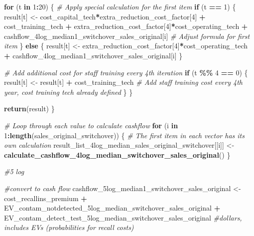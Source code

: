 \documentclass[
]{article}
\newenvironment{Shaded}{\begin{snugshade}}{\end{snugshade}}
\newcommand{\CommentTok}[1]{\textcolor[rgb]{0.56,0.35,0.01}{\textit{#1}}}
\newcommand{\ControlFlowTok}[1]{\textcolor[rgb]{0.13,0.29,0.53}{\textbf{#1}}}
\newcommand{\DecValTok}[1]{\textcolor[rgb]{0.00,0.00,0.81}{#1}}
\newcommand{\FunctionTok}[1]{\textcolor[rgb]{0.13,0.29,0.53}{\textbf{#1}}}
\newcommand{\NormalTok}[1]{#1}
\newcommand{\OtherTok}[1]{\textcolor[rgb]{0.56,0.35,0.01}{#1}}
\newcommand{\SpecialCharTok}[1]{\textcolor[rgb]{0.81,0.36,0.00}{\textbf{#1}}}
\begin{document}
\begin{Shaded}
\begin{Highlighting}[]
  \ControlFlowTok{for}\NormalTok{ (t }\ControlFlowTok{in} \DecValTok{1}\SpecialCharTok{:}\DecValTok{20}\NormalTok{) \{}
    \CommentTok{\# Apply special calculation for the first item}
    \ControlFlowTok{if}\NormalTok{ (t }\SpecialCharTok{==} \DecValTok{1}\NormalTok{) \{}
\NormalTok{      result[t] }\OtherTok{\textless{}{-}}\NormalTok{ cost\_capital\_tech}\SpecialCharTok{*}\NormalTok{extra\_reduction\_cost\_factor[}\DecValTok{4}\NormalTok{] }\SpecialCharTok{+}\NormalTok{ cost\_training\_tech }\SpecialCharTok{+}\NormalTok{ extra\_reduction\_cost\_factor[}\DecValTok{4}\NormalTok{]}\SpecialCharTok{*}\NormalTok{cost\_operating\_tech }\SpecialCharTok{+}\NormalTok{ cashflow\_4log\_median1\_switchover\_sales\_original[i] }\CommentTok{\# Adjust formula for first item}
\NormalTok{    \} }\ControlFlowTok{else}\NormalTok{ \{}
\NormalTok{      result[t] }\OtherTok{\textless{}{-}}\NormalTok{ extra\_reduction\_cost\_factor[}\DecValTok{4}\NormalTok{]}\SpecialCharTok{*}\NormalTok{cost\_operating\_tech }\SpecialCharTok{+}\NormalTok{ cashflow\_4log\_median1\_switchover\_sales\_original[i]}
\NormalTok{    \}}
    
    \CommentTok{\# Add additional cost for staff training every 4th iteration}
    \ControlFlowTok{if}\NormalTok{ (t }\SpecialCharTok{\%\%} \DecValTok{4} \SpecialCharTok{==} \DecValTok{0}\NormalTok{) \{}
\NormalTok{      result[t] }\OtherTok{\textless{}{-}}\NormalTok{ result[t] }\SpecialCharTok{+}\NormalTok{ cost\_training\_tech  }\CommentTok{\# Add staff training cost every 4th year, cost training tech already defined}
\NormalTok{    \}}
\NormalTok{  \}}
  
  \FunctionTok{return}\NormalTok{(result)}
\NormalTok{\}}

\CommentTok{\# Loop through each value to calculate cashflow}
\ControlFlowTok{for}\NormalTok{ (i }\ControlFlowTok{in} \DecValTok{1}\SpecialCharTok{:}\FunctionTok{length}\NormalTok{(sales\_original\_switchover)) \{}
  \CommentTok{\# The first item in each vector has its own calculation}
\NormalTok{  result\_list\_4log\_median\_sales\_original\_switchover[[i]] }\OtherTok{\textless{}{-}} \FunctionTok{calculate\_cashflow\_4log\_median\_switchover\_sales\_original}\NormalTok{()}
\NormalTok{\}}



\CommentTok{\#5 log }

\CommentTok{\#convert to cash flow}
\NormalTok{cashflow\_5log\_median1\_switchover\_sales\_original }\OtherTok{\textless{}{-}}\NormalTok{ cost\_recallins\_premium }\SpecialCharTok{+}\NormalTok{ EV\_contam\_notdetected\_5log\_median\_switchover\_sales\_original }\SpecialCharTok{+}\NormalTok{ EV\_contam\_detect\_test\_5log\_median\_switchover\_sales\_original }\CommentTok{\#dollars, includes EVs (probabilities for recall costs)}



\end{Highlighting}
\end{Shaded}
\end{document}
